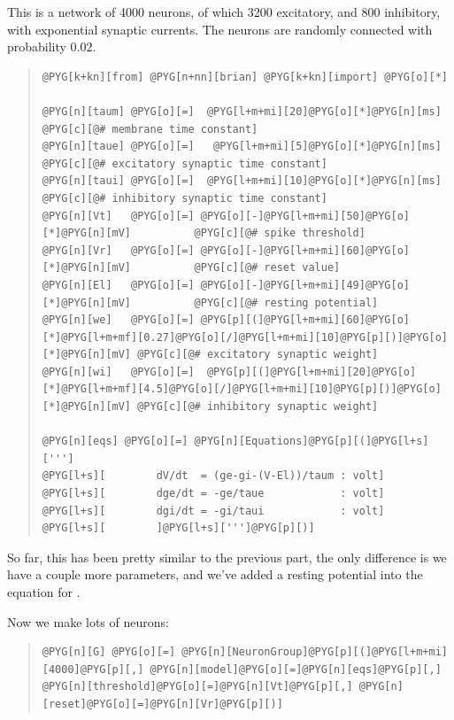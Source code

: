 \documentclass[letterpaper,10pt,english]{manual}
\begin{document}
This is a network of 4000 neurons, of which 3200 excitatory, and 800 inhibitory, with
exponential synaptic currents. The neurons are randomly connected with probability 0.02.
\begin{quote}

\begin{Verbatim}[commandchars=@\[\]]
@PYG[k+kn][from] @PYG[n+nn][brian] @PYG[k+kn][import] @PYG[o][*]

@PYG[n][taum] @PYG[o][=]  @PYG[l+m+mi][20]@PYG[o][*]@PYG[n][ms]          @PYG[c][@# membrane time constant]
@PYG[n][taue] @PYG[o][=]   @PYG[l+m+mi][5]@PYG[o][*]@PYG[n][ms]          @PYG[c][@# excitatory synaptic time constant]
@PYG[n][taui] @PYG[o][=]  @PYG[l+m+mi][10]@PYG[o][*]@PYG[n][ms]          @PYG[c][@# inhibitory synaptic time constant]
@PYG[n][Vt]   @PYG[o][=] @PYG[o][-]@PYG[l+m+mi][50]@PYG[o][*]@PYG[n][mV]          @PYG[c][@# spike threshold]
@PYG[n][Vr]   @PYG[o][=] @PYG[o][-]@PYG[l+m+mi][60]@PYG[o][*]@PYG[n][mV]          @PYG[c][@# reset value]
@PYG[n][El]   @PYG[o][=] @PYG[o][-]@PYG[l+m+mi][49]@PYG[o][*]@PYG[n][mV]          @PYG[c][@# resting potential]
@PYG[n][we]   @PYG[o][=] @PYG[p][(]@PYG[l+m+mi][60]@PYG[o][*]@PYG[l+m+mf][0.27]@PYG[o][/]@PYG[l+m+mi][10]@PYG[p][)]@PYG[o][*]@PYG[n][mV] @PYG[c][@# excitatory synaptic weight]
@PYG[n][wi]   @PYG[o][=]  @PYG[p][(]@PYG[l+m+mi][20]@PYG[o][*]@PYG[l+m+mf][4.5]@PYG[o][/]@PYG[l+m+mi][10]@PYG[p][)]@PYG[o][*]@PYG[n][mV] @PYG[c][@# inhibitory synaptic weight]

@PYG[n][eqs] @PYG[o][=] @PYG[n][Equations]@PYG[p][(]@PYG[l+s][''']
@PYG[l+s][        dV/dt  = (ge-gi-(V-El))/taum : volt]
@PYG[l+s][        dge/dt = -ge/taue            : volt]
@PYG[l+s][        dgi/dt = -gi/taui            : volt]
@PYG[l+s][        ]@PYG[l+s][''']@PYG[p][)]
\end{Verbatim}
\end{quote}

So far, this has been pretty similar to the previous part, the only
difference is we have a couple more parameters, and we've added a
resting potential  into the equation for .

Now we make lots of neurons:
\begin{quote}

\begin{Verbatim}[commandchars=@\[\]]
@PYG[n][G] @PYG[o][=] @PYG[n][NeuronGroup]@PYG[p][(]@PYG[l+m+mi][4000]@PYG[p][,] @PYG[n][model]@PYG[o][=]@PYG[n][eqs]@PYG[p][,] @PYG[n][threshold]@PYG[o][=]@PYG[n][Vt]@PYG[p][,] @PYG[n][reset]@PYG[o][=]@PYG[n][Vr]@PYG[p][)]
\end{Verbatim}
\end{quote}
\end{document}

